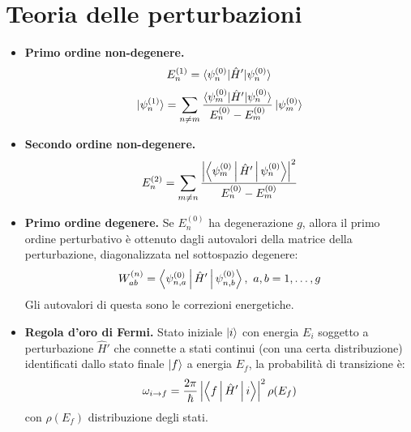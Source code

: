 \documentclass[11pt, a4paper]{scrartcl} %
\numberwithin{equation}{section}
\theoremstyle{style2}
\theoremstyle{style1}
\begin{document}
\section{Teoria delle perturbazioni}
\begin{multicols}{2}
	\begin{itemize}
		\item {\sffamily \bfseries Primo ordine non-degenere.} 
			\begin{equation}
				E^{(1)} _n = \braket{\psi ^{(0)} _n|\hat{H}'|\psi ^{(0)} _n} 
			\end{equation}
			\begin{equation}
				\ket{\psi ^{(1)} _n} = \sum_{n\neq m} \frac{\braket{\psi _m^{(0)} |\hat{H}'|\psi ^{(0)} _n} }{E_n^{(0)} - E_m^{(0)} } \ket{\psi _m^{(0)} } 
			\end{equation}
			\item {\sffamily \bfseries Secondo ordine non-degenere.} 
				\begin{equation}
					E^{(2)} _n = \sum_{m\neq n}^{} \frac{\left\lvert \Braket{\psi ^{(0)} _m|\hat{H}'|\psi ^{(0)} _n}  \right\rvert ^2}{E^{(0)} _n - E^{(0)} _m}
				\end{equation}
				\item {\sffamily \bfseries Primo ordine degenere.} 
					Se $E_n^{(0)} $ ha degenerazione $g$, allora il primo ordine perturbativo \`e ottenuto dagli autovalori della matrice della perturbazione, diagonalizzata nel sottospazio degenere:
			\begin{equation}
				W^{(n)} _{ab} = \Braket{\psi ^{(0)} _{n,a} |\hat{H}'|\psi ^{(0)} _{n,b}} ,\ a,b=1,\ldots,g
			\end{equation}
			Gli autovalori di questa sono le correzioni energetiche.
			\item {\sffamily \bfseries Regola d'oro di Fermi.} 
				Stato iniziale $\ket{i} $ con energia $E_i$ soggetto a perturbazione $\hat{H}'$ che connette a stati continui (con una certa distribuzione) identificati dallo stato finale $\ket{f} $ a energia $E_f$, la probabilit\`a di transizione \`e:
				\begin{equation}
					\omega_{i\to f} = \frac{2\pi}{\hbar }\left\lvert \Braket{f|\hat{H}'|i}  \right\rvert ^2 \rho (E_f)
				\end{equation}
				con $\rho (E_f)$ distribuzione degli stati.
	\end{itemize}
\end{multicols}
\end{document}
